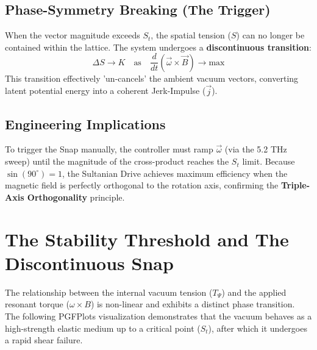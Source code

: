 \documentclass[11pt]{article}
\begin{document}
\subsection{Phase-Symmetry Breaking (The Trigger)}
When the vector magnitude exceeds $S_t$, the spatial tension ($S$) can no longer be contained within the lattice. The system undergoes a \textbf{discontinuous transition}:
\begin{equation}
    \Delta S \to K \quad \text{as} \quad \frac{d}{dt} \left( \vec{\omega} \times \vec{B} \right) \to \text{max}
\end{equation}
This transition effectively 'un-cancels' the ambient vacuum vectors, converting latent potential energy into a coherent Jerk-Impulse ($\vec{j}$). 



\subsection{Engineering Implications}
To trigger the Snap manually, the controller must ramp $\vec{\omega}$ (via the 5.2 THz sweep) until the magnitude of the cross-product reaches the $S_t$ limit. Because $\sin(90^\circ) = 1$, the Sultanian Drive achieves maximum efficiency when the magnetic field is perfectly orthogonal to the rotation axis, confirming the \textbf{Triple-Axis Orthogonality} principle.

\section{The Stability Threshold and The Discontinuous Snap}

The relationship between the internal vacuum tension ($T_{\Psi}$) and the applied resonant torque ($\omega \times B$) is non-linear and exhibits a distinct phase transition. The following PGFPlots visualization demonstrates that the vacuum behaves as a high-strength elastic medium up to a critical point ($S_t$), after which it undergoes a rapid shear failure.
\end{document}
